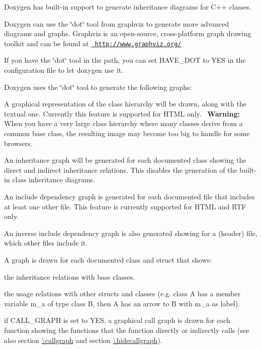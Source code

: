 Doxygen has built-\/in support to generate inheritance diagrams for C++ classes.

Doxygen can use the \char`\"{}dot\char`\"{} tool from graphviz to generate more advanced diagrams and graphs. Graphviz is an open-\/source, cross-\/platform graph drawing toolkit and can be found at \href{http://www.graphviz.org/}{\texttt{ http\+://www.\+graphviz.\+org/}}

If you have the \char`\"{}dot\char`\"{} tool in the path, you can set H\+A\+V\+E\+\_\+\+D\+OT to {\ttfamily Y\+ES} in the configuration file to let doxygen use it.

Doxygen uses the \char`\"{}dot\char`\"{} tool to generate the following graphs\+: 
\begin{DoxyItemize}
\item A graphical representation of the class hierarchy will be drawn, along with the textual one. Currently this feature is supported for H\+T\+ML only.~\newline
 {\bfseries{Warning\+:}} When you have a very large class hierarchy where many classes derive from a common base class, the resulting image may become too big to handle for some browsers. 
\item An inheritance graph will be generated for each documented class showing the direct and indirect inheritance relations. This disables the generation of the built-\/in class inheritance diagrams. 
\item An include dependency graph is generated for each documented file that includes at least one other file. This feature is currently supported for H\+T\+ML and R\+TF only. 
\item An inverse include dependency graph is also generated showing for a (header) file, which other files include it. 
\item A graph is drawn for each documented class and struct that shows\+: 
\begin{DoxyItemize}
\item the inheritance relations with base classes. 
\item the usage relations with other structs and classes (e.\+g. class {\ttfamily A} has a member variable {\ttfamily m\+\_\+a} of type class {\ttfamily B}, then {\ttfamily A} has an arrow to {\ttfamily B} with {\ttfamily m\+\_\+a} as label). 
\end{DoxyItemize}
\item if C\+A\+L\+L\+\_\+\+G\+R\+A\+PH is set to Y\+ES, a graphical call graph is drawn for each function showing the functions that the function directly or indirectly calls (see also section \mbox{\hyperlink{commands_cmdcallgraph}{\textbackslash{}callgraph}} and section \mbox{\hyperlink{commands_cmdhidecallgraph}{\textbackslash{}hidecallgraph}}). 

\end{DoxyItemize}
